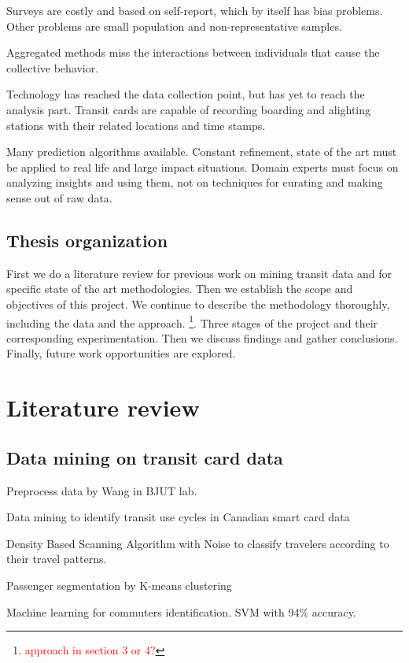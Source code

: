 \documentclass{article}
\newcommand{\selfnote}[1]{\footnote{\textcolor{red}{#1}}}
\begin{document}
Surveys are costly and based on self-report, which by itself has bias problems. Other problems are small population and non-representative samples. 

Aggregated methods miss the interactions between individuals that cause the collective behavior. 

Technology has reached the data collection point, but has yet to reach the analysis part. Transit cards are capable of recording boarding and alighting stations with their related locations and time stamps. 

Many prediction algorithms available. Constant refinement, state of the art must be applied to real life and large impact situations. Domain experts must focus on analyzing insights and using them, not on techniques for curating and making sense out of raw data. 

\subsection{Thesis organization}
First we do a literature review for previous work on mining transit data and for specific state of the art methodologies. Then we establish the scope and objectives of this project. We continue to describe the methodology thoroughly, including the data and the approach. \selfnote{approach in section 3 or 4?}. Three stages of the project and their corresponding experimentation. Then we discuss findings and gather conclusions. Finally, future work opportunities are explored. 


\newpage
\section{Literature review}

\subsection{Data mining on transit card data}
Preprocess data by Wang in BJUT lab. \cite{wang2014research}

Data mining to identify transit use cycles in Canadian smart card data \cite{morency2007measuring}

Density Based Scanning Algorithm with Noise to classify travelers according to their travel patterns.  \cite{ma2013mining}

Passenger segmentation by K-means clustering \cite{bhaskar2015passenger}

Machine learning for commuters identification. SVM with 94\% accuracy. \cite{tu2016impact}
\end{document}
